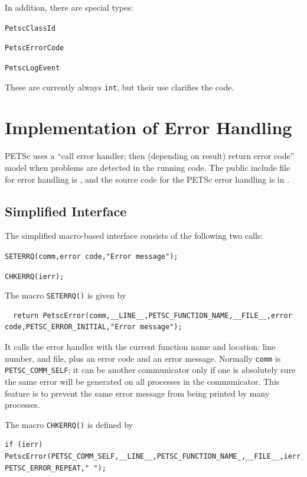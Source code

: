 In addition, there are special types:
\begin{tightitemize}
  \item \lstinline{PetscClassId}
  \item \lstinline{PetscErrorCode}
  \item \lstinline{PetscLogEvent}
\end{tightitemize}
These are currently always \lstinline{int}, but their use clarifies the code.

\section{Implementation of Error Handling}

PETSc  uses a ``call error handler; then (depending on result) return
error code'' model when problems are detected in the running code.
The public include file for error handling is
 \href{http://www.mcs.anl.gov/petsc/petsc-master/include/petscerror.h.html}{},
 and the source code for the PETSc error handling is in .

\subsection{Simplified Interface}

The simplified macro-based interface consists of the following two calls:
\begin{tightitemize}
  \item \lstinline{SETERRQ(comm,error code,"Error message");}
  \item \lstinline{CHKERRQ(ierr);}
\end{tightitemize}

The macro \lstinline{SETERRQ()} is given by
\begin{lstlisting}
  return PetscError(comm,__LINE__,PETSC_FUNCTION_NAME,__FILE__,error code,PETSC_ERROR_INITIAL,"Error message");
\end{lstlisting}
It calls the error handler with the current function name and location: line number,
and file, plus an error code and an error message.
Normally \lstinline{comm} is \lstinline{PETSC_COMM_SELF}; it can be another communicator only if
one is absolutely sure the same error will be generated on all processes in the communicator.
This feature is to prevent the same error message from being printed by many processes.


The macro \lstinline{CHKERRQ()} is defined by
\begin{lstlisting}
if (ierr) PetscError(PETSC_COMM_SELF,__LINE__,PETSC_FUNCTION_NAME_,__FILE__,ierr, PETSC_ERROR_REPEAT," ");
\end{lstlisting}


